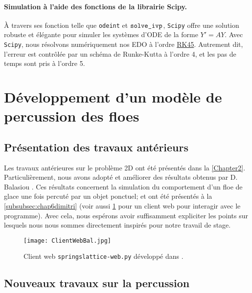  
\paragraph{Simulation à l'aide des fonctions de la librairie Scipy.} À travers ses fonction telle que \texttt{odeint} et $\verb|solve_ivp|$, \texttt{Scipy} offre une solution robuste et élégante pour simuler les systèmes d'ODE de la forme $Y' = AY$. Avec \texttt{Scipy}, nous résolvons numériquement nos EDO à l'ordre \href{https://docs.scipy.org/doc/scipy/reference/generated/scipy.integrate.solve_ivp.html}{RK45}. Autrement dit, l'erreur est contrôlée par un schéma de Runke-Kutta à l'ordre 4, et les pas de temps sont pris à l'ordre 5.







\section{Développement d'un modèle de percussion des floes}




\subsection{Présentation des travaux antérieurs}




Les travaux antérieures sur le problème 2D ont été présentés dans la 
\cref{Chapter2}. Particulièrement, nous avons adopté et améliorer des résultats obtenus par D. Balasiou \parencite{balasoiu2020halthesis}. Ces résultats concernent la simulation du comportement d'un floe de glace une fois percuté par un objet ponctuel; et ont été présentés à la \cref{subsubsec:chap6dimitri} (voir aussi \cref{fig:clientwebbal} pour un client web pour interagir avec le programme). Avec cela, nous espérons avoir suffisamment expliciter les points sur lesquels nous nous sommes directement inspirés pour notre travail de stage.
\begin{figure}[!h]
    \centering
    \texttt{[image: ClientWebBal.jpg]}
    \caption{Client web \texttt{springslattice-web.py} développé dans \parencite[p.197]{balasoiu2020halthesis}.}
    \label{fig:clientwebbal}
\end{figure}




\subsection{Nouveaux travaux sur la percussion}



